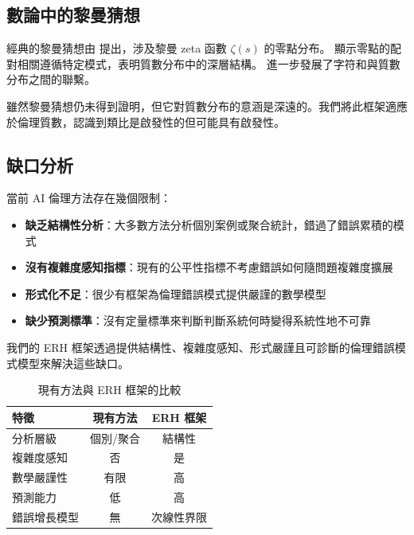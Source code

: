 \documentclass[12pt,a4paper]{article}
\theoremstyle{definition}
\theoremstyle{remark}
\begin{document}
\subsection{數論中的黎曼猜想}

經典的黎曼猜想由 \citet{riemann1859} 提出，涉及黎曼 zeta 函數 $\zeta(s)$ 的零點分布。\citet{montgomery1973} 顯示零點的配對相關遵循特定模式，表明質數分布中的深層結構。\citet{granville2007} 進一步發展了字符和與質數分布之間的聯繫。

雖然黎曼猜想仍未得到證明，但它對質數分布的意涵是深遠的。我們將此框架適應於倫理質數，認識到類比是啟發性的但可能具有啟發性。

\subsection{缺口分析}

當前 AI 倫理方法存在幾個限制：
\begin{itemize}
    \item \textbf{缺乏結構性分析}：大多數方法分析個別案例或聚合統計，錯過了錯誤累積的模式
    \item \textbf{沒有複雜度感知指標}：現有的公平性指標不考慮錯誤如何隨問題複雜度擴展
    \item \textbf{形式化不足}：很少有框架為倫理錯誤模式提供嚴謹的數學模型
    \item \textbf{缺少預測標準}：沒有定量標準來判斷判斷系統何時變得系統性地不可靠
\end{itemize}

我們的 ERH 框架透過提供結構性、複雜度感知、形式嚴謹且可診斷的倫理錯誤模式模型來解決這些缺口。

\begin{table}[htbp]
\centering
\caption{現有方法與 ERH 框架的比較}
\label{tab:comparison}
\begin{tabular}{lcc}
\toprule
\textbf{特徵} & \textbf{現有方法} & \textbf{ERH 框架} \\
\midrule
分析層級 & 個別/聚合 & 結構性 \\
複雜度感知 & 否 & 是 \\
數學嚴謹性 & 有限 & 高 \\
預測能力 & 低 & 高 \\
錯誤增長模型 & 無 & 次線性界限 \\
\bottomrule
\end{tabular}
\end{table}

\end{document}
